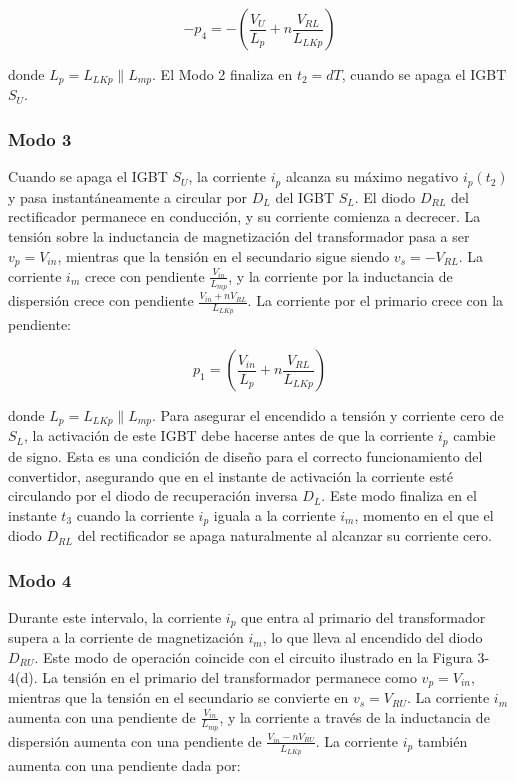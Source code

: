 \[
-p_4 = -\left( \frac{V_U}{L_p} + n \frac{V_{RL}}{L_{LKp}} \right)
\]

donde \( L_p = L_{LKp} \parallel L_{mp} \). El Modo 2 finaliza en \( t_2 = dT \), cuando se apaga el IGBT \( S_U \).

\subsubsection{Modo 3}

Cuando se apaga el IGBT \( S_U \), la corriente \( i_p \) alcanza su máximo negativo \( i_p(t_2) \) y pasa instantáneamente a circular por \( D_L \) del IGBT \( S_L \). El diodo \( D_{RL} \) del rectificador permanece en conducción, y su corriente comienza a decrecer. La tensión sobre la inductancia de magnetización del transformador pasa a ser \( v_p = V_{in} \), mientras que la tensión en el secundario sigue siendo \( v_s = -V_{RL} \). La corriente \( i_m \) crece con pendiente \( \frac{V_{in}}{L_{mp}} \), y la corriente por la inductancia de dispersión crece con pendiente \( \frac{V_{in} + nV_{RL}}{L_{LKp}} \). La corriente por el primario crece con la pendiente:

\[
p_1 = \left( \frac{V_{in}}{L_p} + n \frac{V_{RL}}{L_{LKp}} \right)
\]

donde \( L_p = L_{LKp} \parallel L_{mp} \). Para asegurar el encendido a tensión y corriente cero de \( S_L \), la activación de este IGBT debe hacerse antes de que la corriente \( i_p \) cambie de signo. Esta es una condición de diseño para el correcto funcionamiento del convertidor, asegurando que en el instante de activación la corriente esté circulando por el diodo de recuperación inversa \( D_L \). Este modo finaliza en el instante \( t_3 \) cuando la corriente \( i_p \) iguala a la corriente \( i_m \), momento en el que el diodo \( D_{RL} \) del rectificador se apaga naturalmente al alcanzar su corriente cero.

\subsubsection{Modo 4}

Durante este intervalo, la corriente \( i_p \) que entra al primario del transformador supera a la corriente de magnetización \( i_m \), lo que lleva al encendido del diodo \( D_{RU} \). Este modo de operación coincide con el circuito ilustrado en la Figura 3-4(d). La tensión en el primario del transformador permanece como \( v_p = V_{in} \), mientras que la tensión en el secundario se convierte en \( v_s = V_{RU} \). La corriente \( i_m \) aumenta con una pendiente de \( \frac{V_{in}}{L_{mp}} \), y la corriente a través de la inductancia de dispersión aumenta con una pendiente de \( \frac{V_{in} - nV_{RU}}{L_{LKp}} \). La corriente \( i_p \) también aumenta con una pendiente dada por:

